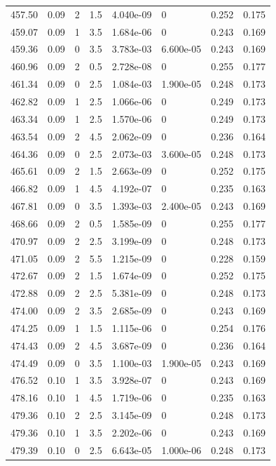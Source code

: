 \documentclass[preview]{standalone}
\begin{document}
{{{{{{{\begin{tabular}{L{1.2cm}C{1.2cm} C{0.3cm}C{0.5cm} C{1.4cm}C{1.4cm} C{1.4cm}C{1.4cm}}
  457.50  &  0.09  & 2     & 1.5 &  4.040e-09  & 0  & 0.252 &  0.175   \\ 
  459.07  &  0.09  & 1     & 3.5 &  1.684e-06  & 0  & 0.243 &  0.169   \\ 
  459.36  &  0.09  & 0     & 3.5 &  3.783e-03  & 6.600e-05  & 0.243 &  0.169   \\ 
  460.96  &  0.09  & 2     & 0.5 &  2.728e-08  & 0  & 0.255 &  0.177   \\ 
  461.34  &  0.09  & 0     & 2.5 &  1.084e-03  & 1.900e-05  & 0.248 &  0.173   \\ 
  462.82  &  0.09  & 1     & 2.5 &  1.066e-06  & 0  & 0.249 &  0.173   \\ 
  463.34  &  0.09  & 1     & 2.5 &  1.570e-06  & 0  & 0.249 &  0.173   \\ 
  463.54  &  0.09  & 2     & 4.5 &  2.062e-09  & 0  & 0.236 &  0.164   \\ 
  464.36  &  0.09  & 0     & 2.5 &  2.073e-03  & 3.600e-05  & 0.248 &  0.173   \\ 
  465.61  &  0.09  & 2     & 1.5 &  2.663e-09  & 0  & 0.252 &  0.175   \\ 
  466.82  &  0.09  & 1     & 4.5 &  4.192e-07  & 0  & 0.235 &  0.163   \\ 
  467.81  &  0.09  & 0     & 3.5 &  1.393e-03  & 2.400e-05  & 0.243 &  0.169   \\ 
  468.66  &  0.09  & 2     & 0.5 &  1.585e-09  & 0  & 0.255 &  0.177   \\ 
  470.97  &  0.09  & 2     & 2.5 &  3.199e-09  & 0  & 0.248 &  0.173   \\ 
  471.05  &  0.09  & 2     & 5.5 &  1.215e-09  & 0  & 0.228 &  0.159   \\ 
  472.67  &  0.09  & 2     & 1.5 &  1.674e-09  & 0  & 0.252 &  0.175   \\ 
  472.88  &  0.09  & 2     & 2.5 &  5.381e-09  & 0  & 0.248 &  0.173   \\ 
  474.00  &  0.09  & 2     & 3.5 &  2.685e-09  & 0  & 0.243 &  0.169   \\ 
  474.25  &  0.09  & 1     & 1.5 &  1.115e-06  & 0  & 0.254 &  0.176   \\ 
  474.43  &  0.09  & 2     & 4.5 &  3.687e-09  & 0  & 0.236 &  0.164   \\ 
  474.49  &  0.09  & 0     & 3.5 &  1.100e-03  & 1.900e-05  & 0.243 &  0.169   \\ 
  476.52  &  0.10  & 1     & 3.5 &  3.928e-07  & 0  & 0.243 &  0.169   \\ 
  478.16  &  0.10  & 1     & 4.5 &  1.719e-06  & 0  & 0.235 &  0.163   \\ 
  479.36  &  0.10  & 2     & 2.5 &  3.145e-09  & 0  & 0.248 &  0.173   \\ 
  479.36  &  0.10  & 1     & 3.5 &  2.202e-06  & 0  & 0.243 &  0.169   \\ 
  479.39  &  0.10  & 0     & 2.5 &  6.643e-05  & 1.000e-06  & 0.248 &  0.173   \\ 
\hline 
\end{tabular} 

}}}}}}}
\end{document}
